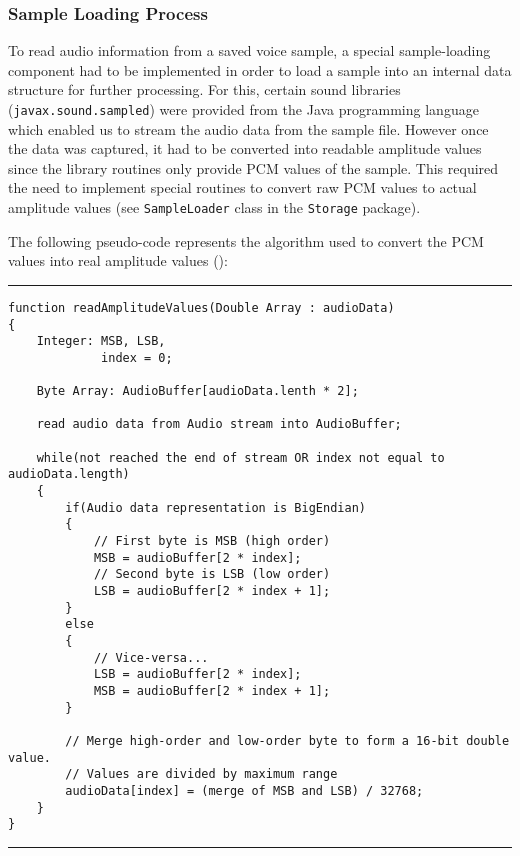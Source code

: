 \subsubsection{Sample Loading Process}

To read audio information from a saved voice sample, a special sample-loading
component had to be implemented in order to load a sample into an internal data
structure for further processing. For this, certain sound libraries (\verb+javax.sound.sampled+)
were provided from the Java programming language which enabled us to
stream the audio data from the sample file. However once the data was captured, it
had to be converted into readable amplitude values since the library routines only
provide PCM values of the sample. This required the need to implement special
routines to convert raw PCM values to actual amplitude values (see \verb+SampleLoader+ class in
the \verb+Storage+ package).

\clearpage
The following pseudo-code represents the algorithm used to convert the PCM values
into real amplitude values (\cite{javasun}):

\vspace{15pt}
\hrule
\begin{verbatim}
function readAmplitudeValues(Double Array : audioData)
{
    Integer: MSB, LSB,
             index = 0;

    Byte Array: AudioBuffer[audioData.lenth * 2];

    read audio data from Audio stream into AudioBuffer;

    while(not reached the end of stream OR index not equal to audioData.length)
    {
        if(Audio data representation is BigEndian)
        {
            // First byte is MSB (high order)
            MSB = audioBuffer[2 * index];
            // Second byte is LSB (low order)
            LSB = audioBuffer[2 * index + 1];
        }
        else
        {
            // Vice-versa...
            LSB = audioBuffer[2 * index];
            MSB = audioBuffer[2 * index + 1];
        }

        // Merge high-order and low-order byte to form a 16-bit double value.
        // Values are divided by maximum range
        audioData[index] = (merge of MSB and LSB) / 32768;
    }
}
\end{verbatim}
\hrule
\vspace{15pt}

